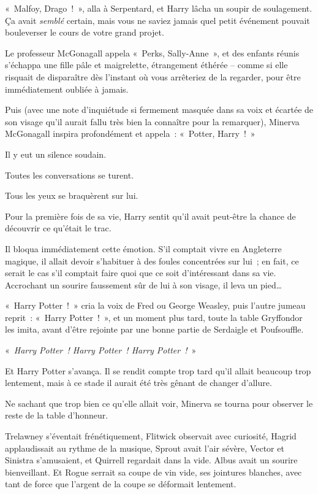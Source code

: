 «~Malfoy, Drago~!~», alla à Serpentard, et Harry lâcha un soupir de soulagement. Ça avait \emph{semblé} certain, mais vous ne saviez jamais quel petit événement pouvait bouleverser le cours de votre grand projet.

Le professeur McGonagall appela «~Perks, Sally-Anne~», et des enfants réunis s'échappa une fille pâle et maigrelette, étrangement éthérée -- comme si elle risquait de disparaître dès l'instant où vous arrêteriez de la regarder, pour être immédiatement oubliée à jamais.

Puis (avec une note d'inquiétude si fermement masquée dans sa voix et écartée de son visage qu'il aurait fallu très bien la connaître pour la remarquer), Minerva McGonagall inspira profondément et appela~: «~Potter, Harry~!~»

Il y eut un silence soudain.

Toutes les conversations se turent.

Tous les yeux se braquèrent sur lui.

Pour la première fois de sa vie, Harry sentit qu'il avait peut-être la chance de découvrir ce qu'était le trac.

Il bloqua immédiatement cette émotion. S'il comptait vivre en Angleterre magique, il allait devoir s'habituer à des foules concentrées sur lui~; en fait, ce serait le cas s'il comptait faire quoi que ce soit d'intéressant dans sa vie. Accrochant un sourire faussement sûr de lui à son visage, il leva un pied…

«~Harry Potter~!~» cria la voix de Fred ou George Weasley, puis l'autre jumeau reprit~: «~Harry Potter~!~», et un moment plus tard, toute la table Gryffondor les imita, avant d'être rejointe par une bonne partie de Serdaigle et Poufsouffle.

«~\emph{Harry Potter~! Harry Potter~! Harry Potter~!}~»

Et Harry Potter s'avança. Il se rendit compte trop tard qu'il allait beaucoup trop lentement, mais à ce stade il aurait été très gênant de changer d'allure.

\later

Ne sachant que trop bien ce qu'elle allait voir, Minerva se tourna pour observer le reste de la table d'honneur.

Trelawney s'éventait frénétiquement, Flitwick observait avec curiosité, Hagrid applaudissait au rythme de la musique, Sprout avait l'air sévère, Vector et Sinistra s'amusaient, et Quirrell regardait dans la vide. Albus avait un sourire bienveillant. Et Rogue serrait sa coupe de vin vide, ses jointures blanches, avec tant de force que l'argent de la coupe se déformait lentement.

